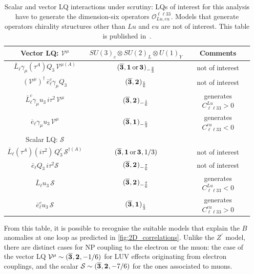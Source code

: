 \begin{table}[!ht]
	\centering
	{
		\begin{tabular}{ccc }
			\toprule
			Vector LQ: $\mathcal{V^\mu}$ & $SU(3)_{c} \otimes SU(2)_{L} \otimes U(1)_{Y}$ & Comments \\
			\midrule
			$ \bar L_\ell  \gamma_\mu (\tau^A) Q_3 \, \mathcal{V}^{\mu (A)} $ & $(\overline{\irrep{3}},\irrep{1}\,\text{or}\,\irrep{3} )_{-{2\over3}}$ & not of interest \\
			$  ( \mathcal{V^\mu} )^{\dagger} \,\bar e_\ell^c  \gamma_\mu Q_3 $ & $(\overline{\irrep{3}},\irrep{2} )_{5\over6}$ & not of interest \\
			$\bar{L}^c_\ell \gamma_\mu u_3\, i\tau^2 \, \mathcal{V^\mu}$ & $(\overline{\irrep{3}},\irrep{2} )_{-{1\over6}}$ & generates $C^{Lu}_{\ell \ell 33} > 0$\\
			$ \overline {e}_\ell \gamma_\mu u_3\, \mathcal{V^\mu}$ & $(\overline{\irrep{3}},\irrep{1} )_{-{5\over3}}$ & generates $C^{eu}_{\ell \ell 33} < 0$ \\    
			\midrule
			Scalar LQ: $\mathcal{S}$ &  &  \\
			\midrule
			$\bar L_\ell (\tau^A) (i \tau^{2}) \, Q_3^{c} \,\mathcal{S}^{\dagger (A)} $ & $(\overline{\irrep{3}},\irrep{1}\,\text{or}\,\irrep{3} ,1/3 )$ & not of interest  \\    
			$\bar e_\ell Q_3 \,  i \tau^2 \mathcal{S} $ & $(\overline{\irrep{3}},\irrep{2} )_{-{7\over6}}$ & not of interest \\
			$\bar L_\ell u_3\, \mathcal{S} $  & $(\overline{\irrep{3}},\irrep{2} )_{-{7\over6}}$  & generates $C^{Lu}_{\ell \ell 33} < 0$ \\
			$\bar e_\ell^c u_3\, \mathcal{S}$ & $(\overline{\irrep{3}},\irrep{1})_{1\over3}$ & generates $C^{eu}_{\ell \ell 33} > 0$ \\
			\bottomrule
		\end{tabular}
	}
	\caption{Scalar and vector LQ interactions under scrutiny: LQs of interest for this analysis have to generate the dimension-six operators $\mathcal O_{Lu,eu}^{\ell \ell 33}$. Models that generate operators chirality structures other than $Lu$ and $eu$ are not of interest. This table is published in~\cite{Alasfar:2020mne}.}
	\label{tab:LQmodels}
\end{table}
From this table, it is possible to recognise the suitable models that explain the $B$ anomalies at one loop as predicted in \autoref{fig:2D_correlations}. Unlike the $Z^\prime$ model, there are distinct cases for NP coupling to the electron or the muon: the case of the vector LQ $ \mathcal V^\mu\sim(\overline{\irrep{3}},\irrep{2}, -1/6 )$ for LUV effects originating from electron couplings, and the scalar $\mathcal S\sim (\overline{\irrep{3}},\irrep{2} ,-7/6 )$ for the ones associated to muons.
